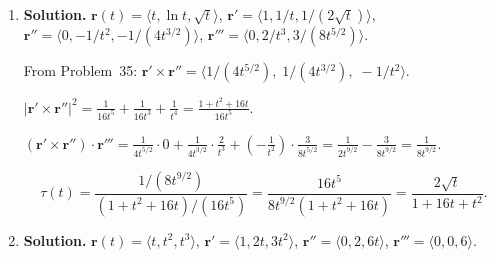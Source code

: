 \begin{enumerate}
$\mathbf{T}(0)=\frac{1}{\sqrt{3}}\langle 1,1,-1\rangle$.

$\mathbf{r}''(0)=\langle 0,1,1\rangle$.
$\mathbf{r}'(0)\times\mathbf{r}''(0)=\begin{vmatrix}\mathbf{i}&\mathbf{j}&\mathbf{k}\\1&1&-1\\0&1&1\end{vmatrix}=\langle 1+1, 0-1, 1-0\rangle = \langle 2,-1,1\rangle$.

$|\mathbf{r}'\times\mathbf{r}''|=\sqrt{4+1+1}=\sqrt{6}$.
$\mathbf{B}(0)=\frac{1}{\sqrt{6}}\langle 2,-1,1\rangle$.

$\mathbf{N}(0)=\mathbf{B}(0)\times\mathbf{T}(0)=\frac{1}{\sqrt{6}\sqrt{3}}\begin{vmatrix}\mathbf{i}&\mathbf{j}&\mathbf{k}\\2&-1&1\\1&1&-1\end{vmatrix}=\frac{1}{\sqrt{18}}\langle 1-1,\; 1+2,\; 2+1\rangle = \frac{1}{3\sqrt{2}}\langle 0,3,3\rangle$.

$=\frac{1}{\sqrt{2}}\langle 0,1,1\rangle$.
One can verify $|\langle 0,1,1\rangle/\sqrt{2}|=1$.

\[
\boxed{\mathbf{T}(0)=\frac{1}{\sqrt{3}}\langle 1,1,-1\rangle,\quad \mathbf{N}(0)=\frac{1}{\sqrt{2}}\langle 0,1,1\rangle,\quad \mathbf{B}(0)=\frac{1}{\sqrt{6}}\langle 2,-1,1\rangle.}
\]

\item \textbf{Solution.}
$\mathbf{r}(t)=\langle t, \ln t, \sqrt{t}\rangle$, $\mathbf{r}'=\langle 1,1/t, 1/(2\sqrt{t})\rangle$, $\mathbf{r}''=\langle 0,-1/t^2,-1/(4t^{3/2})\rangle$, $\mathbf{r}'''=\langle 0,2/t^3,3/(8t^{5/2})\rangle$.

From Problem~35: $\mathbf{r}'\times\mathbf{r}''=\langle 1/(4t^{5/2}),\; 1/(4t^{3/2}),\; -1/t^2\rangle$.

$|\mathbf{r}'\times\mathbf{r}''|^2=\frac{1}{16t^5}+\frac{1}{16t^3}+\frac{1}{t^4}=\frac{1+t^2+16t}{16t^5}$.

$(\mathbf{r}'\times\mathbf{r}'')\cdot\mathbf{r}'''=\frac{1}{4t^{5/2}}\cdot 0+\frac{1}{4t^{3/2}}\cdot\frac{2}{t^3}+\left(-\frac{1}{t^2}\right)\cdot\frac{3}{8t^{5/2}}=\frac{1}{2t^{9/2}}-\frac{3}{8t^{9/2}}=\frac{1}{8t^{9/2}}$.

\[
\boxed{\tau(t)=\frac{1/(8t^{9/2})}{(1+t^2+16t)/(16t^5)}=\frac{16t^5}{8t^{9/2}(1+t^2+16t)}=\frac{2\sqrt{t}}{1+16t+t^2}.}
\]

\item \textbf{Solution.}
$\mathbf{r}(t)=\langle t, t^2, t^3\rangle$, $\mathbf{r}'=\langle 1,2t,3t^2\rangle$, $\mathbf{r}''=\langle 0,2,6t\rangle$, $\mathbf{r}'''=\langle 0,0,6\rangle$.


\end{enumerate}
